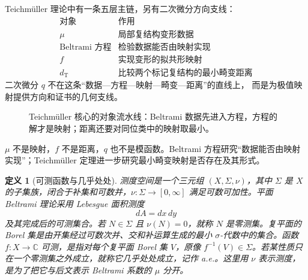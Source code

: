 \documentclass[UTF8,fontset=none,a4paper,11pt]{ctexart}
\theoremstyle{foundation-definition}
\newtheorem{definition}{定义}[section]
\theoremstyle{foundation-theorem}
\theoremstyle{foundation-proposition}
\theoremstyle{foundation-example}
\theoremstyle{foundation-remark}
\theoremstyle{foundation-theorem}
\begin{document}
Teichmüller 理论中有一条五层主链，另有二次微分方向支线：
\[
\begin{array}{c|c}
\text{对象}&\text{作用}\\
\hline
\mu&\text{局部复结构变形数据}\\
\text{Beltrami 方程}&\text{检验数据能否由映射实现}\\
f&\text{实现变形的拟共形映射}\\
d_{\mathrm T}&\text{比较两个标记复结构的最小畸变距离}
\end{array}
\]
二次微分 \(q\) 不在这条“数据—方程—映射—畸变—距离”的直线上，
而是为极值映射提供方向和证书的几何支线。
\begin{figure}[htbp]
\centering
{}
\caption{Teichmüller 核心的对象流水线：Beltrami 数据先进入方程，方程的解才是映射；距离还要对同位类中的映射取最小。}
\label{fig:beltrami-object-pipeline}
\end{figure}

\(\mu\) 不是映射，\(f\) 不是距离，\(q\) 也不是模函数。Beltrami 方程研究“数据能否由映射实现”；Teichmüller 定理进一步研究最小畸变映射是否存在及其形式。

\begin{definition}[可测函数与几乎处处]\label{def:measurable}
测度空间是一个三元组 \((X,\Sigma,\nu)\)，其中 \(\Sigma\) 是 \(X\) 的子集族，闭合于补集和可数并，\(\nu:\Sigma\to[0,\infty]\) 满足可数可加性。平面 Beltrami 理论采用 Lebesgue 面积测度
\[
dA=dx\,dy
\]
及其完成后的可测集合。若 \(N\in\Sigma\) 且 \(\nu(N)=0\)，就称 \(N\) 是零测集。复平面的 Borel 集是由开集经过可数次并、交和补运算生成的最小 \(\sigma\)-代数中的集合。函数 \(f:X\to\mathbb C\) 可测，是指对每个复平面 Borel 集 \(V\)，原像 \(f^{-1}(V)\in\Sigma\)。若某性质只在一个零测集之外成立，就称它几乎处处成立，记作 a.e.。这里用 \(\nu\) 表示测度，是为了把它与后文表示 Beltrami 系数的 \(\mu\) 分开。
\end{definition}
\end{document}
